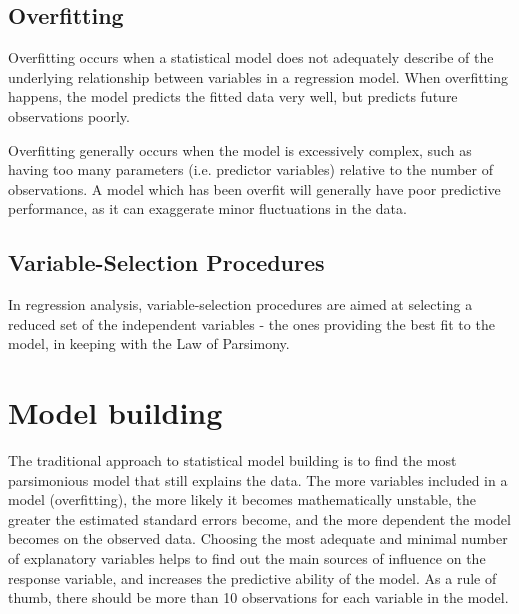 \documentclass[a4paper,12pt]{article}
\begin{document}
\subsection{Overfitting}

Overfitting occurs when a statistical model does not adequately describe of the underlying relationship between variables in a regression model. When overfitting happens, the model predicts the fitted data very well, but predicts future observations poorly.

Overfitting generally occurs when the model is excessively complex, such as having too many parameters (i.e. predictor variables) relative to the number of observations. A model which has been overfit will generally have poor predictive performance, as it can exaggerate minor fluctuations in the data.


\subsection{Variable-Selection Procedures}

In regression analysis, variable-selection procedures are aimed at selecting a reduced set of the independent variables - the ones providing the best fit to the model, in keeping with the Law of Parsimony.

\section{Model building}

The traditional approach to statistical model building is to find the most parsimonious model that still explains the data. The more variables included in a model (overfitting), the more likely it becomes mathematically unstable, the greater the estimated standard errors become, and the more dependent the model becomes on the observed data. Choosing the most adequate and minimal number of explanatory variables helps to find out the main sources of influence on the response variable, and increases the predictive ability of the model. As a rule of thumb, there should be more than 10 observations for each variable in the model.
%
\end{document}
